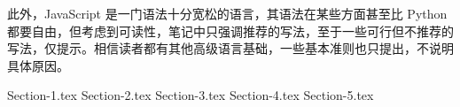 \documentclass{PionpillNote-book}
\begin{document}
此外，JavaScript 是一门语法十分宽松的语言，其语法在某些方面甚至比 Python 都要自由，但考虑到可读性，笔记中只强调推荐的写法，至于一些可行但不推荐的写法，仅提示。相信读者都有其他高级语言基础，一些基本准则也只提出，不说明具体原因。

\date{\today}
\newpage

\tableofcontents

\newpage

\setcounter{page}{1} 
\pagestyle{fancy}


{Section-1.tex}
{Section-2.tex}
{Section-3.tex}
{Section-4.tex}
{Section-5.tex}
\end{document}
